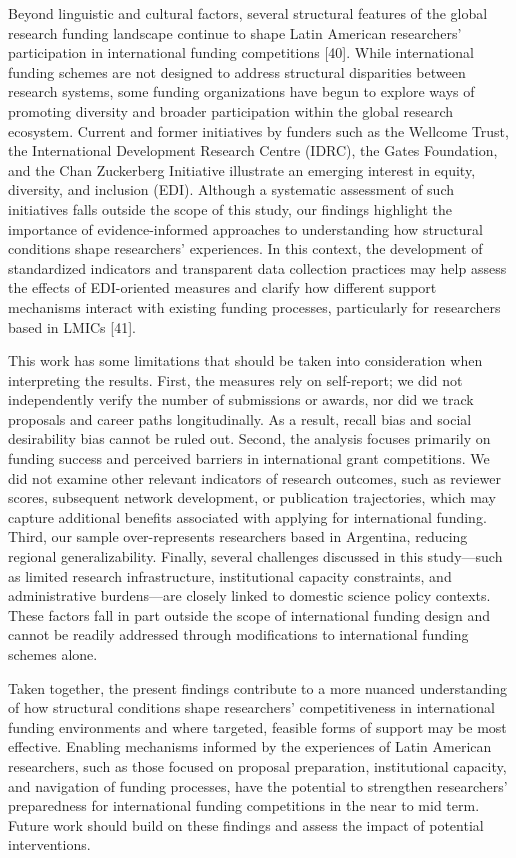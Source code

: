 \documentclass[
  letterpaper,
  DIV=11,
  numbers=noendperiod]{scrartcl}
\begin{document}
Beyond linguistic and cultural factors, several structural features of
the global research funding landscape continue to shape Latin American
researchers' participation in international funding competitions
{[}40{]}. While international funding schemes are not designed to
address structural disparities between research systems, some funding
organizations have begun to explore ways of promoting diversity and
broader participation within the global research ecosystem. Current and
former initiatives by funders such as the Wellcome Trust, the
International Development Research Centre (IDRC), the Gates Foundation,
and the Chan Zuckerberg Initiative illustrate an emerging interest in
equity, diversity, and inclusion (EDI). Although a systematic assessment
of such initiatives falls outside the scope of this study, our findings
highlight the importance of evidence-informed approaches to
understanding how structural conditions shape researchers' experiences.
In this context, the development of standardized indicators and
transparent data collection practices may help assess the effects of
EDI-oriented measures and clarify how different support mechanisms
interact with existing funding processes, particularly for researchers
based in LMICs {[}41{]}.

This work has some limitations that should be taken into consideration
when interpreting the results. First, the measures rely on self-report;
we did not independently verify the number of submissions or awards, nor
did we track proposals and career paths longitudinally. As a result,
recall bias and social desirability bias cannot be ruled out. Second,
the analysis focuses primarily on funding success and perceived barriers
in international grant competitions. We did not examine other relevant
indicators of research outcomes, such as reviewer scores, subsequent
network development, or publication trajectories, which may capture
additional benefits associated with applying for international funding.
Third, our sample over-represents researchers based in Argentina,
reducing regional generalizability. Finally, several challenges
discussed in this study---such as limited research infrastructure,
institutional capacity constraints, and administrative burdens---are
closely linked to domestic science policy contexts. These factors fall
in part outside the scope of international funding design and cannot be
readily addressed through modifications to international funding schemes
alone.

Taken together, the present findings contribute to a more nuanced
understanding of how structural conditions shape researchers'
competitiveness in international funding environments and where
targeted, feasible forms of support may be most effective. Enabling
mechanisms informed by the experiences of Latin American researchers,
such as those focused on proposal preparation, institutional capacity,
and navigation of funding processes, have the potential to strengthen
researchers' preparedness for international funding competitions in the
near to mid term. Future work should build on these findings and assess
the impact of potential interventions.
\end{document}
